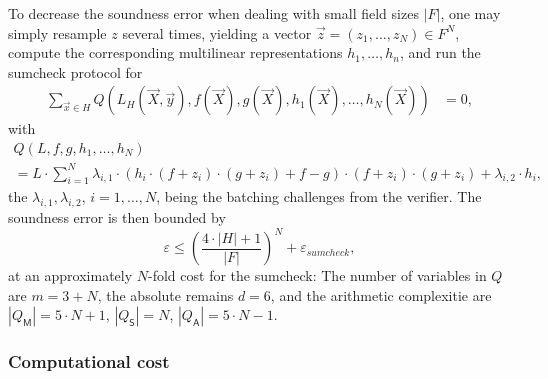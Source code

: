 \documentclass[11pt]{article}
\theoremstyle{definition}
\theoremstyle{remark}
\begin{document}
To decrease the soundness error when dealing with small field sizes $|F|$, one may simply resample $z$ several times, yielding a vector $\vec z = (z_{1}, \ldots, z_N)\in F^N$, compute the corresponding multilinear representations $h_1, \ldots, h_n$,  and run the sumcheck protocol for
\begin{align} 
\label{e:sumcheckm}
	\sum_{\vec x \in H} Q(L_H(\vec X, \vec y), f(\vec X),  g(\vec X), h_1(\vec X),  \ldots,  h_N(\vec X))&= 0,
\end{align}
with
\begin{multline*}
Q(L , f, g, h_1, \ldots, h_N) 
\\
=   
L \cdot\sum_{i=1}^N \lambda_{i,1}\cdot   \left(h_i\cdot (f + z_i)\cdot (g + z_i) + f - g \right)\cdot  (f + z_i) \cdot (g + z_i) +  \lambda_{i,2} \cdot h_i,
\end{multline*}
the $\lambda_{i,1}, \lambda_{i,2}$, $i=1,\ldots, N$, being the batching challenges from the verifier.
The soundness error is then bounded by 
\[
\varepsilon \leq \left(\frac{4\cdot |H| + 1}{|F|}\right)^N + \varepsilon_{sumcheck},
\]
at an approximately  $N$-fold cost for the sumcheck:
The number of variables in $Q$ are  $m= 3 + N$, the absolute remains $d=6$, and the arithmetic complexitie are 
$|Q_\mathsf M|= 5\cdot N + 1$, $|Q_\mathsf S| = N$,  $|Q_\mathsf A|= 5 \cdot N - 1$.





\subsubsection{Computational cost}
\label{s:PA:cost}
\end{document}
